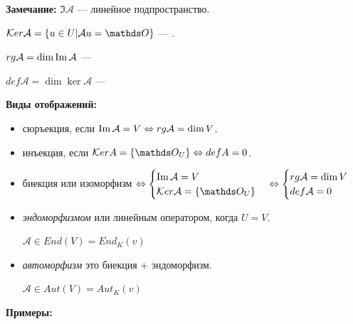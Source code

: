 \textbf{Замечание:} $\Im \mathcal{A}$ --- линейное подпространство.

$\ker  \mathcal{A} = \{u \in U| \mathcal{A} u = \zero\}$ %
--- .

 $rg \mathcal{A} = \dim \operatorname{Im} \mathcal{A}$ ---  

 $def \mathcal{A} = \dim \ker \mathcal{A}$ --- 

\newpage %

\textbf{Виды отображений:}

\begin{itemize}
    \item сюръекция, если $\operatorname{Im} \mathcal{A} = V \Leftrightarrow rg \mathcal{A}= \dim V$.
    \item инъекция, если $\ker A = \{\zero_U\} \Leftrightarrow def A = 0$.

    \item биекция или изоморфизм $\Leftrightarrow \begin{cases}
        \Im \mathcal{A} = V\\
        \ker \mathcal{A} = \{\zero_U\}
    \end{cases} \Leftrightarrow \begin{cases}
        \rg \mathcal{A} = \dim V \\
        def \mathcal{A} = 0
    \end{cases}$
    \item \emph{эндоморфизмом} или линейным оператором, когда $U = V$.

    $\mathcal{A} \in End(V) = End_K(v)$ %
    \item \emph{автоморфизм} это биекция + эндоморфизм.
    
     $\mathcal{A} \in Aut(V) = Aut_K(v)$ %
\end{itemize}

\textbf{Примеры:}

